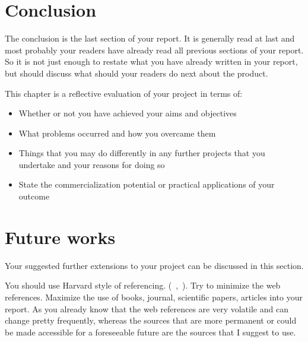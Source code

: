 \documentclass[12pt, a4paper]{report}
\begin{document}







\chapter{Conclusion} %
\label{cha:conclusion}

The conclusion is the last section of your report. It is generally read at last and most probably your readers have already read all previous sections of your report. So it is not just enough to restate what you have already written in your report, but should discuss what should your readers do next about the product.

This chapter is a reflective evaluation of your project in terms of:
\begin{itemize}
  \item Whether or not you have achieved your aims and objectives
  \item What problems occurred and how you overcame them
  \item Things that you may do differently in any further projects that you undertake and your reasons for doing so
  \item State the commercialization potential or practical applications of your outcome
\end{itemize}

\chapter{Future works} %
\label{cha:future_works}
Your suggested further extensions to your project can be discussed in this section.


You should use Harvard style of referencing. (~\cite{dawson2005projects},~\cite{weaver2004success}). Try to minimize the web references. Maximize the use of books, journal, scientific papers, articles into your report. As you already know that the web references are very volatile and can change pretty frequently, whereas the sources that are more permanent or could be made accessible for a foreseeable future are the sources that I suggest to use.

\printbibliography[title={References}]
\end{document}
